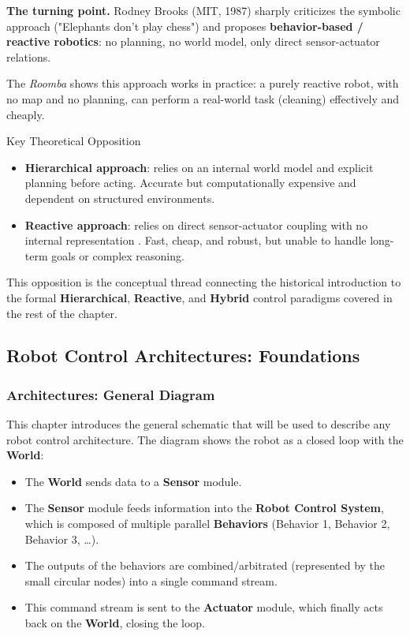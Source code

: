 \textbf{The turning point.} Rodney Brooks (MIT, 1987) sharply criticizes the symbolic approach ("Elephants don't play chess") and proposes \textbf{behavior-based / reactive robotics}: no planning, no world model, only direct sensor-actuator relations.

The \textit{Roomba} shows this approach works in practice: a purely reactive robot, with no map and no planning, can perform a real-world task (cleaning) effectively and cheaply.

\begin{defbox}{Key Theoretical Opposition}
    \begin{itemize}
\item \textbf{Hierarchical approach}: relies on an internal world model and explicit planning before acting. Accurate but computationally expensive and dependent on structured environments.

\item \textbf{Reactive approach}: relies on direct sensor-actuator coupling with no internal representation . Fast, cheap, and robust, but unable to handle long-term goals or complex reasoning.


    \end{itemize}
\end{defbox}

This opposition is the conceptual thread connecting the historical introduction to the formal \textbf{Hierarchical}, \textbf{Reactive}, and \textbf{Hybrid} control paradigms covered in the rest of the chapter.

\subsection{Robot Control Architectures: Foundations}

\subsubsection{Architectures: General Diagram}

This chapter introduces the general schematic that will be used  to describe any robot control architecture. The diagram shows the robot as a closed loop with the \textbf{World}:

\begin{itemize}
    \item The \textbf{World} sends data to a \textbf{Sensor} module.
    \item The \textbf{Sensor} module feeds information into the \textbf{Robot Control System}, which is composed of multiple parallel \textbf{Behaviors} (Behavior 1, Behavior 2, Behavior 3, \ldots).
    \item The outputs of the behaviors are combined/arbitrated (represented by the small circular nodes) into a single command stream.
    \item This command stream is sent to the \textbf{Actuator} module, which finally acts back on the \textbf{World}, closing the loop.
\end{itemize}

